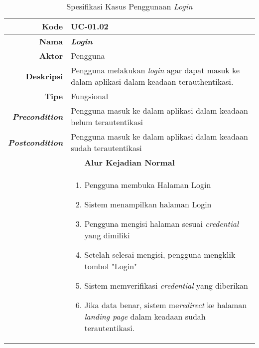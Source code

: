\begin{table}[H]
	\centering
	\caption{Spesifikasi Kasus Penggunaan \textit{Login} }
	\label{uc01.02}
	\begin{tabular}{|r|p{8cm}|}
		\hline
		\textbf{Kode}                                                    & UC-01.02                                                     \\ \hline
		\textbf{Nama}                                                    & \textbf{\textit{Login}}                                         \\ \hline
		\textbf{Aktor}                                                   & Pengguna                                                    \\ \hline
		\textbf{Deskripsi}                                               & Pengguna melakukan \textit{login} agar dapat masuk ke dalam aplikasi dalam keadaan terauthentikasi. \\ \hline
		\textbf{Tipe}                                                    & Fungsional                                                  \\ \hline
		\textbf{\textit{Precondition}}
		& Pengguna masuk ke dalam aplikasi dalam keadaan belum terautentikasi                    \\ \hline
		\textbf{\textit{Postcondition}} 
		& Pengguna masuk ke dalam aplikasi dalam keadaan sudah terautentikasi          \\ \hline
		\multicolumn{2}{|c|}{\textbf{Alur Kejadian Normal}}                                                                            \\ \hline
		\multicolumn{1}{|l|}{}                                           & 
		\begin{enumerate}
			\item Pengguna membuka Halaman Login
			\item \label{uc0102-show1page}Sistem menampilkan halaman Login
			\item Pengguna mengisi halaman sesuai \textit{credential} yang dimiliki
			\item Setelah selesai mengisi, pengguna mengklik tombol "Login"
			\item \label{al-0102-a} Sistem memverifikasi \textit{credential} yang diberikan
			\item Jika data benar, sistem me\textit{redirect} ke halaman \textit{landing page} dalam keadaan sudah terautentikasi.
		\end{enumerate}
		\\ \hline

\end{tabular}
\end{table}

